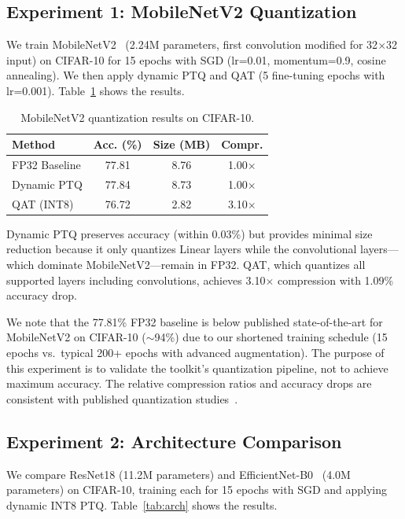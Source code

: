 \documentclass[10pt,twocolumn]{article}
\begin{document}
\subsection{Experiment 1: MobileNetV2 Quantization}

We train MobileNetV2~\cite{mobilenetv3} (2.24M parameters, first convolution modified for 32$\times$32 input) on CIFAR-10 for 15 epochs with SGD (lr=0.01, momentum=0.9, cosine annealing).
We then apply dynamic PTQ and QAT (5 fine-tuning epochs with lr=0.001).
Table~\ref{tab:cifar10} shows the results.

\begin{table}[t]
\caption{MobileNetV2 quantization results on CIFAR-10.}
\label{tab:cifar10}
\centering
\begin{tabular}{lccc}
\toprule
\textbf{Method} & \textbf{Acc. (\%)} & \textbf{Size (MB)} & \textbf{Compr.} \\
\midrule
FP32 Baseline & 77.81 & 8.76 & 1.00$\times$ \\
Dynamic PTQ & 77.84 & 8.73 & 1.00$\times$ \\
QAT (INT8) & 76.72 & 2.82 & 3.10$\times$ \\
\bottomrule
\end{tabular}
\end{table}

Dynamic PTQ preserves accuracy (within 0.03\%) but provides minimal size reduction because it only quantizes Linear layers while the convolutional layers---which dominate MobileNetV2---remain in FP32.
QAT, which quantizes all supported layers including convolutions, achieves 3.10$\times$ compression with 1.09\% accuracy drop.

We note that the 77.81\% FP32 baseline is below published state-of-the-art for MobileNetV2 on CIFAR-10 ($\sim$94\%) due to our shortened training schedule (15 epochs vs.\ typical 200+ epochs with advanced augmentation).
The purpose of this experiment is to validate the toolkit's quantization pipeline, not to achieve maximum accuracy.
The relative compression ratios and accuracy drops are consistent with published quantization studies~\cite{ptq, qat}.

\subsection{Experiment 2: Architecture Comparison}

We compare ResNet18 (11.2M parameters) and EfficientNet-B0~\cite{efficientnet} (4.0M parameters) on CIFAR-10, training each for 15 epochs with SGD and applying dynamic INT8 PTQ.
Table~\ref{tab:arch} shows the results.
\end{document}
